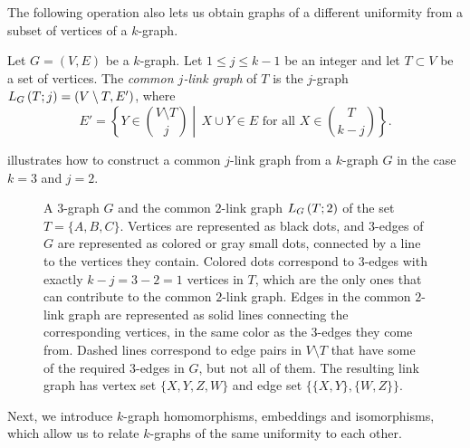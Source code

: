 The following operation also lets us obtain graphs of a
different uniformity from a subset of vertices of a $k$-graph.

\begin{definition} \label{def:link}
    Let $G = (V, E)$ be a $k$-graph.
    Let $1 \leq j \leq k - 1$ be an integer and let
    $T \subset V$ be a set of vertices.
    The \emph{common $j$-link graph} of $T$ is the $j$-graph $L_{G}\left(T; j\right) = (V \setminus T, E')$, where
    \[
        E' = \left\{Y \in \binom{V \setminus T}{j}\middle\vert \, X \cup Y \in E \text{ for all } X \in \binom{T}{k-j}\right\}.
    \]
\end{definition}

 illustrates how to construct
a common $j$-link graph from a $k$-graph $G$ in the case $k=3$ and $j=2$.

\begin{figure}[ht]
    \centering
    
    \caption{A $3$-graph $G$ and the common $2$-link graph $L_{G}\left(T; 2\right)$ of the set $T = \{A, B, C\}$.
        Vertices are represented as black dots, and $3$-edges of $G$ are represented as colored or gray small dots,
        connected by a line to the vertices they contain.
        Colored dots correspond to $3$-edges with exactly
        $k - j = 3 - 2 = 1$ vertices in $T$, which are the only ones that can contribute to the common $2$-link graph.
        Edges in the common $2$-link graph are represented as solid lines connecting the corresponding vertices,
        in the same color as the $3$-edges they come from.
        Dashed lines correspond to edge pairs
        in $V \setminus T$ that have some of the required $3$-edges in $G$, but not all of them.
        The resulting link graph has vertex set $\{X, Y, Z, W\}$ and edge set
        $\{\{X, Y\}, \{W, Z\}\}$.
    }
    \label{fig:link}
\end{figure}

Next, we introduce $k$-graph homomorphisms, embeddings and isomorphisms, which allow us
to relate $k$-graphs of the same uniformity to each other.

